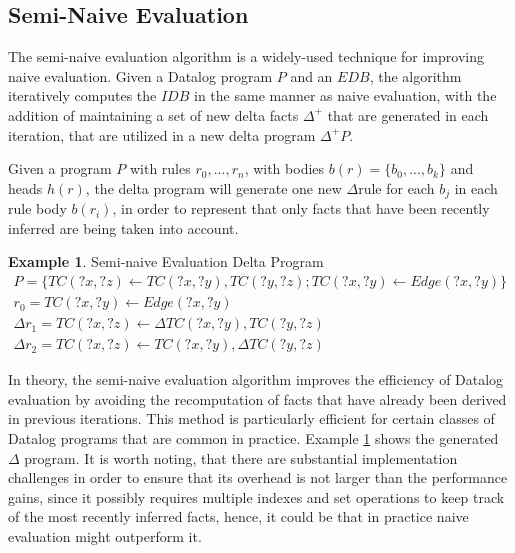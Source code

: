 \documentclass[sigconf,screen,review,natbib]{acmart}
\theoremstyle{definition}
\newtheorem{exmp}{Example}[section]
\begin{document}
\subsection{Semi-Naive Evaluation}

The semi-naive evaluation algorithm \cite{datalog} is a widely-used technique for improving naive evaluation.
Given a Datalog program $P$ and an $EDB$, the algorithm iteratively computes the $IDB$ in the same manner as
naive evaluation, with the addition of maintaining a set of new delta facts $\Delta^+$ that are generated in
each iteration, that are utilized in a new delta program $\Delta^+P$.

Given a program $P$ with rules $r_0, ..., r_n$, with bodies $b(r) = \{b_0, ..., b_k\}$ and heads $h(r)$, the
delta program will generate one new $\Delta$rule for each $b_j$ in each rule body $b(r_i)$, in order to
represent that only facts that have been recently inferred are being taken into account.

\begin{exmp}{Semi-naive Evaluation Delta Program}
	\tiny
	\begin{align}
		P = \{ TC(?x, ?z) \leftarrow TC(?x, ?y), TC(?y, ?z); TC(?x, ?y) \leftarrow Edge(?x, ?y) \} \nonumber                                                           \\
		r_0 = TC(?x, ?y) \leftarrow Edge(?x, ?y)                                                                                                                       \\
		\Delta r_1 = TC(?x, ?z) \leftarrow \Delta TC(?x, ?y), TC(?y, ?z)                                                                                     \nonumber \\
		\Delta r_2 = TC(?x, ?z) \leftarrow TC(?x, ?y), \Delta TC(?y, ?z)
	\end{align}
	\label{exsne}
\end{exmp}

In theory, the semi-naive evaluation algorithm improves the efficiency of Datalog evaluation by avoiding
the recomputation of facts that have already been derived in previous iterations. This method is particularly
efficient for certain classes of Datalog programs that are common in practice. Example \ref{exsne} shows
the generated $\Delta$ program. It is worth noting, that there are substantial implementation challenges in order
to ensure that its overhead is not larger than the performance gains, since it possibly requires multiple
indexes and set operations to keep track of the most recently inferred facts, hence, it could be that in practice
naive evaluation might outperform it.
\end{document}

